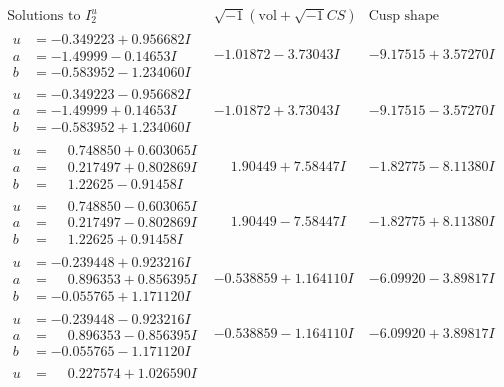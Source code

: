 \documentclass[1p]{elsarticle_modified}
\theoremstyle{definition}
\newcommand{\I}{\sqrt{-1}}
\begin{document}
$$\begin{array}{c|c|c}  
\text{Solutions to }I^u_{2}& \I (\text{vol} + \sqrt{-1}CS) & \text{Cusp shape}\\
 \hline 
\begin{aligned}
u &= -0.349223 + 0.956682 I \\
a &= -1.49999 - 0.14653 I \\
b &= -0.583952 - 1.234060 I\end{aligned}
 & -1.01872 - 3.73043 I & -9.17515 + 3.57270 I \\ \hline\begin{aligned}
u &= -0.349223 - 0.956682 I \\
a &= -1.49999 + 0.14653 I \\
b &= -0.583952 + 1.234060 I\end{aligned}
 & -1.01872 + 3.73043 I & -9.17515 - 3.57270 I \\ \hline\begin{aligned}
u &= \phantom{-}0.748850 + 0.603065 I \\
a &= \phantom{-}0.217497 + 0.802869 I \\
b &= \phantom{-}1.22625 - 0.91458 I\end{aligned}
 & \phantom{-}1.90449 + 7.58447 I & -1.82775 - 8.11380 I \\ \hline\begin{aligned}
u &= \phantom{-}0.748850 - 0.603065 I \\
a &= \phantom{-}0.217497 - 0.802869 I \\
b &= \phantom{-}1.22625 + 0.91458 I\end{aligned}
 & \phantom{-}1.90449 - 7.58447 I & -1.82775 + 8.11380 I \\ \hline\begin{aligned}
u &= -0.239448 + 0.923216 I \\
a &= \phantom{-}0.896353 + 0.856395 I \\
b &= -0.055765 + 1.171120 I\end{aligned}
 & -0.538859 + 1.164110 I & -6.09920 - 3.89817 I \\ \hline\begin{aligned}
u &= -0.239448 - 0.923216 I \\
a &= \phantom{-}0.896353 - 0.856395 I \\
b &= -0.055765 - 1.171120 I\end{aligned}
 & -0.538859 - 1.164110 I & -6.09920 + 3.89817 I \\ \hline\begin{aligned}
u &= \phantom{-}0.227574 + 1.026590 I \\

\end{aligned}
\end{array}$$
\end{document}
